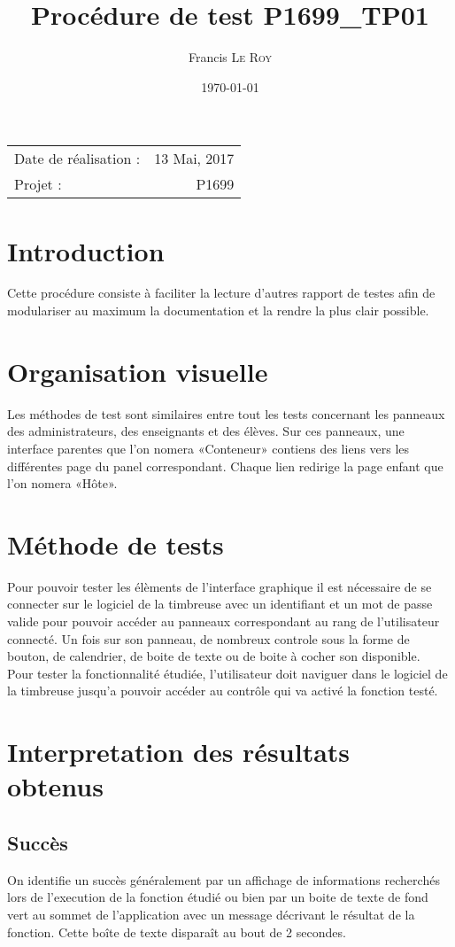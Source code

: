 \documentclass[10pt,a4paper,onecolumn]{article}
\title{Procédure de test P1699\_TP01}
\author{Francis \textsc{Le Roy}}
\date{\today}
\begin{document}
\maketitle
\thispagestyle{fancy}

\begin{center}
\begin{tabular}{l r}
Date de réalisation : & 13 Mai, 2017 \\
Projet : & P1699
\end{tabular}
\end{center}

\section{Introduction}
Cette procédure consiste à faciliter la lecture d'autres rapport de testes afin de modulariser au maximum la documentation et la rendre la plus clair possible.
\section{Organisation visuelle}
Les méthodes de test sont similaires entre tout les tests concernant les panneaux des administrateurs, des enseignants et des élèves. Sur ces panneaux, une interface parentes que l'on nomera «Conteneur» contiens des liens vers les différentes page du panel correspondant. 
Chaque lien redirige la page enfant que l'on nomera «Hôte».\\

\section{Méthode de tests}
Pour pouvoir tester les élèments de l'interface graphique il est nécessaire de se connecter sur le logiciel de la timbreuse avec un identifiant et un mot de passe valide pour pouvoir accéder au panneaux correspondant au rang de l'utilisateur connecté. Un fois sur son panneau, de nombreux controle sous la forme de bouton, de calendrier, de boite de texte ou de boite à cocher son disponible. \\
Pour tester la fonctionnalité étudiée, l'utilisateur doit naviguer dans le logiciel de la timbreuse jusqu'a pouvoir accéder au contrôle qui va activé la fonction testé.

\section{Interpretation des résultats obtenus}
\subsection{Succès}
On identifie un succès généralement par un affichage de informations recherchés lors de l'execution de la fonction étudié ou bien par un boite de texte de fond vert au sommet de l'application avec un message décrivant le résultat de la fonction. Cette boîte de texte disparaît au bout de 2 secondes.
\end{document}
